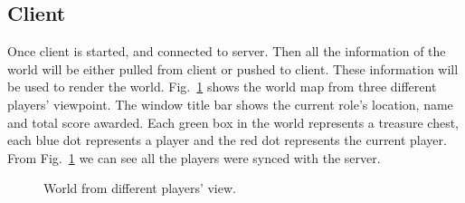 \documentclass[11pt, oneside]{article}   	%
\begin{document}
\subsection{Client}
Once client is started, and connected to server. Then all the information of the world will be either pulled from client or pushed to client. These information will be used to render the world.
Fig.~\ref{fig:world} shows the world map from three different players' viewpoint.
The window title bar shows the current role's location, name and total score awarded.
Each green box in the world represents a treasure chest, each blue dot represents a player and the red dot represents the current player.
From Fig.~\ref{fig:world} we can see all the players were synced with the server.
\begin{figure}[htbp] %
   \centering
   \caption{World from different players' view.}
   \label{fig:world}
\end{figure} 
\end{document}
